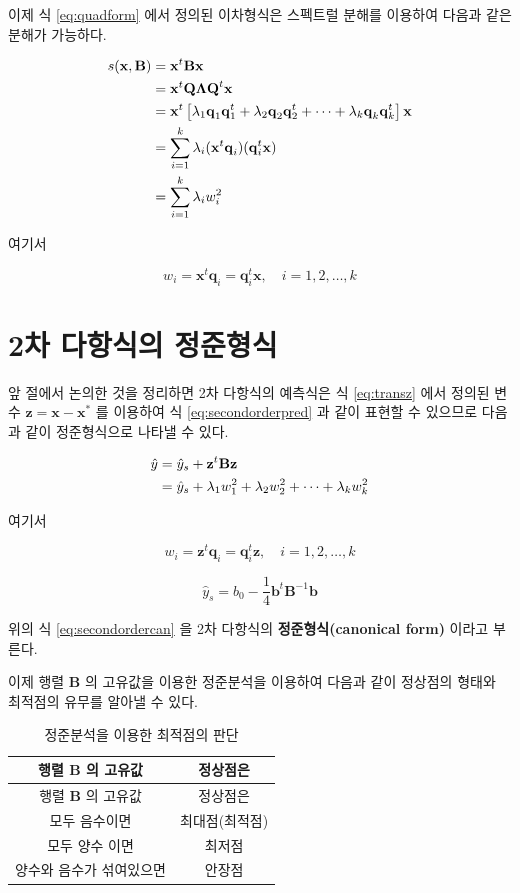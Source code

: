 \documentclass[
]{book}
\newcommand{\bm}[1]{\boldsymbol{\mathbf{#1}}}
\theoremstyle{definition}
\theoremstyle{definition}
\theoremstyle{definition}
\theoremstyle{definition}
\theoremstyle{remark}
\begin{document}
이제 식 \eqref{eq:quadform} 에서 정의된 이차형식은 스펙트럴 분해를 이용하여 다음과 같은
분해가 가능하다.

\begin{align}
s(\bm x, \bm B) & = {\bm x}^t \bm B \bm x \notag \\
    & = {\bm x}^t \bm Q \bm \Lambda {\bm Q}^t \bm x \notag \\
    &= {\bm x}^t  \left [ \lambda_1 \bm q_1 \bm q_1^t + \lambda_2 \bm q_2 \bm q_2^t 
+ \cdots + \lambda_k \bm q_k \bm q_k^t \right ] \bm x \notag \\
& = \sum_{i=1}^k \lambda_i  ( {\bm x}^t \bm q_i)  (\bm q_i^t \bm x) \notag  \\
 & = \sum_{i=1}^k \lambda_i w_i^2 \label{eq:quadform2}
\end{align}

여기서

\[ w_i = {\bm x}^t \bm q_i = \bm q_i^t \bm x, \quad i=1,2,\dots, k \]

\hypertarget{uxcc28-uxb2e4uxd56duxc2dduxc758-uxc815uxc900uxd615uxc2dd}{%
\section{2차 다항식의 정준형식}\label{uxcc28-uxb2e4uxd56duxc2dduxc758-uxc815uxc900uxd615uxc2dd}}

앞 절에서 논의한 것을 정리하면 2차 다항식의 예측식은 식 \eqref{eq:transz} 에서 정의된 변수 \(\bm z = \bm x - {\bm x}^*\) 를 이용하여 식 \eqref{eq:secondorderpred} 과 같이 표현할 수 있으므로 다음과 같이 정준형식으로 나타낼 수 있다.

\begin{align}
\hat y & = \hat y_s +   {\bm z}^t \bm B  {\bm z}  \notag \\
  & = \hat y_s + \lambda_1 w_1^2 + \lambda_2 w_2^2 + \cdots + \lambda_k w_k^2
\label{eq:secondordercan}
\end{align}

여기서

\[w_i = {\bm z}^t \bm q_i = \bm q_i^t \bm z, \quad i=1,2,\dots, k \]

\[ \hat y_s =   b_0 - \frac{1}{4} {\bm b}^t {\bm B}^{-1}{\bm b} \]

위의 식 \eqref{eq:secondordercan} 을 2차 다항식의 \textbf{정준형식(canonical form)} 이라고 부른다.

이제 행렬 \(\bm B\) 의 고유값을 이용한 정준분석을 이용하여 다음과 같이 정상점의 형태와 최적점의 유무를 알아낼 수 있다.

\begin{longtable}[]{@{}cc@{}}
\caption{정준분석을 이용한 최적점의 판단}\tabularnewline
\toprule
행렬 \(\bm B\) 의 고유값 & 정상점은\tabularnewline
\midrule
\endfirsthead
\toprule
행렬 \(\bm B\) 의 고유값 & 정상점은\tabularnewline
\midrule
\endhead
모두 음수이면 & 최대점(최적점)\tabularnewline
모두 양수 이면 & 최저점\tabularnewline
양수와 음수가 섞여있으면 & 안장점\tabularnewline
\bottomrule
\end{longtable}
\end{document}
